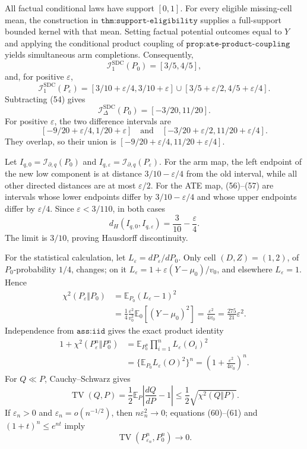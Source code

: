 All factual conditional laws have support \([0,1]\).  For every eligible missing-cell mean, the construction in \(\texttt{thm:support-eligibility}\) supplies a full-support bounded kernel with that mean.  Setting factual potential outcomes equal to \(Y\) and applying the conditional product coupling of \(\texttt{prop:ate-product-coupling}\) yields simultaneous arm completions.  Consequently,
\[
 \mathcal I_1^{\mathrm{SDC}}(P_0)=[3/5,4/5],
\]
and, for positive \(\varepsilon\),
\[
 \mathcal I_1^{\mathrm{SDC}}(P_\varepsilon)
 =[3/10+\varepsilon/4,3/10+\varepsilon]
 \mathbin{\cup}[3/5+\varepsilon/2,4/5+\varepsilon/4].                       \tag{55}
\]
Subtracting (54) gives
\[
 \mathcal I_\Delta^{\mathrm{SDC}}(P_0)=[-3/20,11/20].                        \tag{56}
\]
For positive \(\varepsilon\), the two difference intervals are
\[
 [-9/20+\varepsilon/4,1/20+\varepsilon]
 \quad\text{and}\quad
 [-3/20+\varepsilon/2,11/20+\varepsilon/4].                                  \tag{57}
\]
They overlap, so their union is \([-9/20+\varepsilon/4,11/20+\varepsilon/4]\).

Let \(I_{q,0}=\mathcal I_{\partial,q}(P_0)\) and \(I_{q,\varepsilon}=\mathcal I_{\partial,q}(P_\varepsilon)\).  For the arm map, the left endpoint of the new low component is at distance \(3/10-\varepsilon/4\) from the old interval, while all other directed distances are at most \(\varepsilon/2\).  For the ATE map, (56)--(57) are intervals whose lower endpoints differ by \(3/10-\varepsilon/4\) and whose upper endpoints differ by \(\varepsilon/4\).  Since \(\varepsilon<3/110\), in both cases
\[
 d_H(I_{q,0},I_{q,\varepsilon})
 =\frac3{10}-\frac{\varepsilon}{4}.                                           \tag{58}
\]
The limit is \(3/10\), proving Hausdorff discontinuity.

For the statistical calculation, let \(L_\varepsilon=dP_\varepsilon/dP_0\).  Only cell \((D,Z)=(1,2)\), of \(P_0\)-probability \(1/4\), changes; on it
\(L_\varepsilon=1+\varepsilon(Y-\mu_0)/v_0\), and elsewhere \(L_\varepsilon=1\).  Hence
\[
 \begin{aligned}
 \chi^2(P_\varepsilon\Vert P_0)
 &=\mathbb E_{P_0}(L_\varepsilon-1)^2\\
 &=\frac14\frac{\varepsilon^2}{v_0^2}\mathbb E_0[(Y-\mu_0)^2]
 =\frac{\varepsilon^2}{4v_0}
 =\frac{275}{21}\varepsilon^2.                                               \tag{59}
 \end{aligned}
\]
Independence from \(\texttt{ass:iid}\) gives the exact product identity
\[
 \begin{aligned}
 1+\chi^2(P_\varepsilon^n\Vert P_0^n)
 &=\mathbb E_{P_0^n}\prod_{i=1}^nL_\varepsilon(O_i)^2\\
 &=\{\mathbb E_{P_0}L_\varepsilon(O)^2\}^n
 =\left(1+\frac{\varepsilon^2}{4v_0}\right)^n.                              \tag{60}
 \end{aligned}
\]
For \(Q\ll P\), Cauchy--Schwarz gives
\[
 \operatorname{TV}(Q,P)
 =\frac12\mathbb E_P\left|\frac{dQ}{dP}-1\right|
 \le\frac12\sqrt{\chi^2(Q\Vert P)}.                                        \tag{61}
\]
If \(\varepsilon_n>0\) and \(\varepsilon_n=o(n^{-1/2})\), then \(n\varepsilon_n^2\to0\); equations (60)--(61) and \((1+t)^n\le e^{nt}\) imply
\[
 \operatorname{TV}(P_{\varepsilon_n}^n,P_0^n)\longrightarrow0.               \tag{62}
\]


